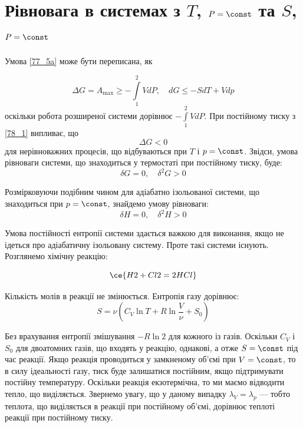 \section{Рівновага в системах  з %
\texorpdfstring{$T$, $P = \const$}{T, P = const} та \texorpdfstring{$S$, $P = \const$}{S, P = const}
}

Умова \eqref{77_5a} може бути переписана, як

\begin{equation} \label{78_1}
\Delta G = A_{\max} \ge -\int\limits^2_1 V dP, \quad dG \le -S dT + V dp
\end{equation}
оскільки робота розширеної системи дорівнює $-\int\limits^2_1 V dP$. При постійному тиску з \eqref{78_1} випливає, що
%
\begin{equation} \label{78_2}
\Delta G < 0
\end{equation}
%
для нерівноважних процесів, що відбуваються при $T$ і $p = \const$. Звідси, умова рівноваги системи, що знаходиться у термостаті при постійному тиску, буде:
%
\begin{equation} \label{78_3}
\delta G = 0, \quad \delta^2 G > 0
\end{equation}

Розмірковуючи подібним чином для адіабатно ізольованої системи, що знаходиться при $p = \const$, знайдемо умову рівноваги:
\begin{equation} \label{78_4}
\delta H = 0, \quad \delta^2 H > 0
\end{equation}

Умова постійності ентропії системи здається важкою для виконання, якщо не ідеться про адіабатичну ізольовану систему. Проте такі системи існують. Розглянемо хімічну реакцію:

\begin{equation*}
\ce{H2 + Cl2 = 2HCl}
\end{equation*}

Кількість молів в реакції не змінюється. Ентропія газу дорівнює:
\begin{equation*}
S = \nu \left(C_V \ln T + R \ln \frac{V}{\nu} + S_0\right)
\end{equation*}

Без врахування ентропії змішування $-R \ln 2$ для кожного із газів. Оскільки $C_V$ і $S_0$ для двоатомних газів, що входять у реакцію, однакові, а отже $S = \const$ під час реакції. Якщо реакція проводиться у замкненому об'ємі при $V = \const$, то в силу ідеальності газу, тиск буде залишатися постійним, якщо підтримувати постійну температуру. Оскільки реакція екзотермічна, то ми маємо відводити тепло, що виділяється. Звернемо увагу, що у даному випадку $\lambda_V = \lambda_p$ --- тобто теплота, що виділяється в реакції при постійному об'ємі, дорівнює теплоті реакції при постійному тиску.

